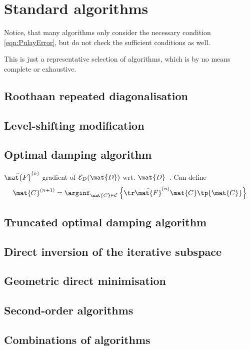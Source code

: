 \section{Standard \SCF algorithms}
\label{sec:SCFAlgorithms}


Notice, that many \SCF algorithms only consider the necessary condition \eqref{eqn:PulayError},
but do not check the sufficient conditions as well.


This is just a representative selection of algorithms,
which is by no means complete or exhaustive.

\subsection{Roothaan repeated diagonalisation}
\label{sec:RoothaanRepeatedDiag}

\subsection{Level-shifting modification}

\subsection{Optimal damping algorithm}
\label{sec:ODA}
$\tilde{\mat{F}}^{(n)}$ gradient of $\mathcal{E}_D(\mat{D})$
wrt. $\mat{D}$~\cite{Lions1988,Cances2000}.
Can define~\cite{Lions1988,Cances2000}
\[
	\mat{C}^{(n+1)} = \arginf_{\mat{C} \in \mathcal{C}}
\left\{ \tr \tilde{\mat{F}}^{(n)} \mat{C} \tp{\mat{C}} \right\} \]

\subsection{Truncated optimal damping algorithm}

\subsection{Direct inversion of the iterative subspace}

\subsection{Geometric direct minimisation}

\subsection{Second-order \SCF algorithms}

\subsection{Combinations of algorithms}
